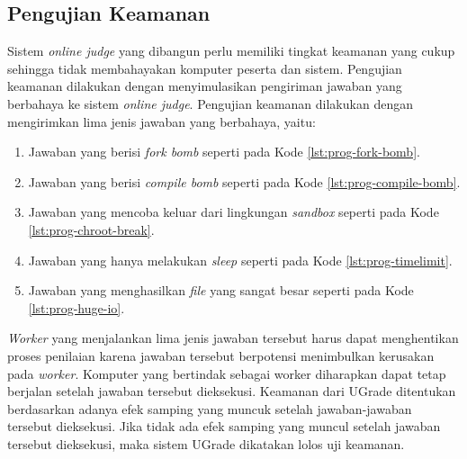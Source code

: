 \subsection{Pengujian Keamanan}
\par Sistem \textit{online judge} yang dibangun perlu memiliki tingkat keamanan yang cukup sehingga tidak membahayakan komputer peserta dan sistem. Pengujian keamanan dilakukan dengan menyimulasikan pengiriman jawaban yang berbahaya ke sistem \textit{online judge}. Pengujian keamanan dilakukan dengan mengirimkan lima jenis jawaban yang berbahaya, yaitu:
\begin{enumerate}
    
    \item Jawaban yang berisi \textit{fork bomb} seperti pada Kode \ref{lst:prog-fork-bomb}.
    
    \item Jawaban yang berisi \textit{compile bomb} seperti pada Kode \ref{lst:prog-compile-bomb}.
    
    \item Jawaban yang mencoba keluar dari lingkungan \textit{sandbox} seperti pada Kode \ref{lst:prog-chroot-break}.
    
    \item Jawaban yang hanya melakukan \textit{sleep} seperti pada Kode \ref{lst:prog-timelimit}.
    
    \item Jawaban yang menghasilkan \textit{file} yang sangat besar seperti pada Kode \ref{lst:prog-huge-io}.
\end{enumerate} 
\textit{Worker} yang menjalankan lima jenis jawaban tersebut harus dapat menghentikan proses penilaian karena jawaban tersebut berpotensi menimbulkan kerusakan pada \textit{worker}. Komputer yang bertindak sebagai worker diharapkan dapat tetap berjalan setelah jawaban tersebut dieksekusi. Keamanan dari UGrade ditentukan berdasarkan adanya efek samping yang muncuk setelah jawaban-jawaban tersebut dieksekusi. Jika tidak ada efek samping yang muncul setelah jawaban tersebut dieksekusi, maka sistem UGrade dikatakan lolos uji keamanan. 

